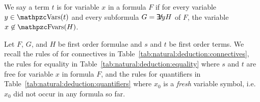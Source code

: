 




\begin{definition}
	We say a term \( t \) is  for variable \( x \)
	in a formula \( F \) if for every variable \( y \in \var(t) \)
	and every subformula \( G = \quantify y H \) of \( F \),
	the variable \( x \not\in\fvar(H) \).
\end{definition}




\begin{definition}\label{def:natural:deduction}
	Let \( F \), \( G \), and \( H \) be first order formulae and
	\(s\) and \(t\) be first order terms.
	We recall the rules of  for connectives
	in Table~\ref{tab:natural:deduction:connectives},
	the rules for equality in Table~\ref{tab:natural:deduction:equality}
	where \( s \) and \( t \) are free for variable \( x \) in formula \( F \),
	and the rules for quantifiers in
	Table~\ref{tab:natural:deduction:quantifiers}
	where
	\( x_0 \) is a \emph{fresh} variable symbol,
	i.e.~\( x_0 \) did not occur in any formula so far.
\end{definition}




